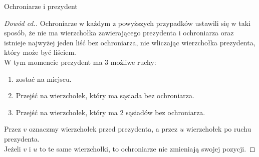 \documentclass[polish]{beamer}
\begin{document}
\begin{frame}{Ochroniarze i prezydent}
    \begin{proof}[Dowód cd.]
        \renewcommand{\qedsymbol}{}
        Ochroniarze w każdym z powyższych przypadków ustawili się w taki sposób, że nie ma wierzchołka zawierającego prezydenta i ochroniarza 
        oraz istnieje najwyżej jeden liść bez ochroniarza, nie wliczając wierzchołka prezydenta, który może być liściem. \\
        \pause
        W tym momencie prezydent ma 3 możliwe ruchy:
        \pause
        \begin{enumerate}[<+->]
            \item zostać na miejscu.
            \item Przejść na wierzchołek, który ma sąsiada bez ochroniarza.
            \item Przejść na wierzchołek, który ma 2 sąsiadów bez ochroniarza.
        \end{enumerate} 
        \pause
        Przez $v$ oznaczmy wierzchołek przed prezydenta, a przez $u$ wierzchołek po ruchu prezydenta.\\
        Jeżeli $v$ i $u$ to te same wierzchołki, to ochroniarze nie zmieniają swojej pozycji.
    \end{proof}
\end{frame}
\end{document}
